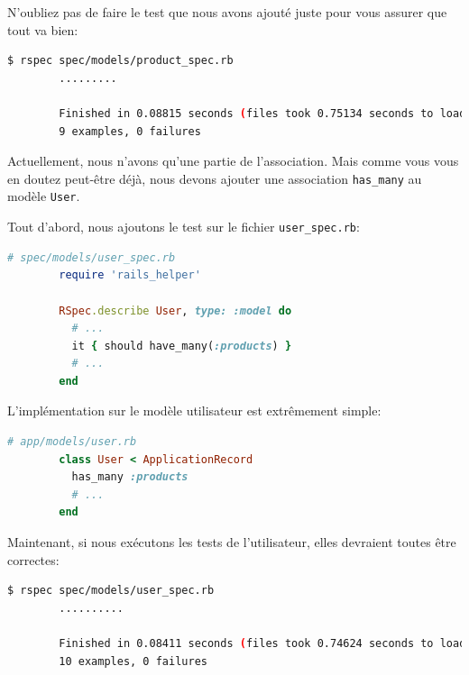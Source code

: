 \documentclass[]{report}
\begin{document}
      N'oubliez pas de faire le test que nous avons ajouté juste pour vous assurer que tout va bien:

      \begin{scriptsize}
        \begin{lstlisting}[language=bash]
        $ rspec spec/models/product_spec.rb
        .........

        Finished in 0.08815 seconds (files took 0.75134 seconds to load)
        9 examples, 0 failures
        \end{lstlisting}
      \end{scriptsize}

      Actuellement, nous n'avons qu'une partie de l'association.  Mais comme vous vous en doutez peut-être déjà, nous devons ajouter une association \verb|has_many| au modèle \verb|User|.

      Tout d'abord, nous ajoutons le test sur le fichier \verb|user_spec.rb|:

      \begin{scriptsize}
        \begin{lstlisting}[language=ruby]
        # spec/models/user_spec.rb
        require 'rails_helper'

        RSpec.describe User, type: :model do
          # ...
          it { should have_many(:products) }
          # ...
        end
        \end{lstlisting}
      \end{scriptsize}

      L'implémentation sur le modèle utilisateur est extrêmement simple:

      \begin{scriptsize}
        \begin{lstlisting}[language=ruby]
        # app/models/user.rb
        class User < ApplicationRecord
          has_many :products
          # ...
        end
        \end{lstlisting}
      \end{scriptsize}

      Maintenant, si nous exécutons les tests de l'utilisateur, elles devraient toutes être correctes:

      \begin{scriptsize}
        \begin{lstlisting}[language=bash]
        $ rspec spec/models/user_spec.rb
        ..........

        Finished in 0.08411 seconds (files took 0.74624 seconds to load)
        10 examples, 0 failures
        \end{lstlisting}
      \end{scriptsize}
\end{document}

